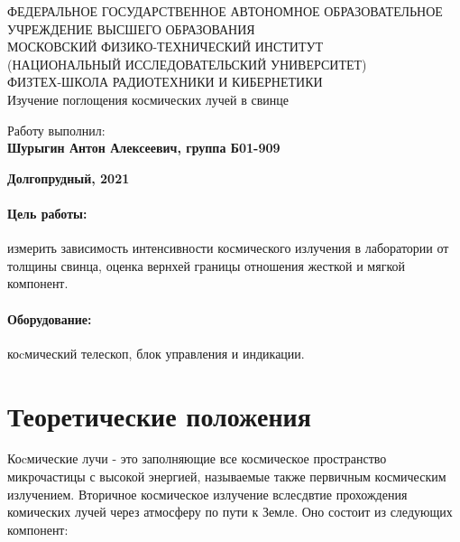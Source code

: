 \documentclass[15pt,a5paper,reqno]{article}
\begin{document}
\begin{center}
  {\small ФЕДЕРАЛЬНОЕ ГОСУДАРСТВЕННОЕ АВТОНОМНОЕ ОБРАЗОВАТЕЛЬНОЕ\\ УЧРЕЖДЕНИЕ ВЫСШЕГО ОБРАЗОВАНИЯ\\ МОСКОВСКИЙ ФИЗИКО-ТЕХНИЧЕСКИЙ ИНСТИТУТ\\ (НАЦИОНАЛЬНЫЙ ИССЛЕДОВАТЕЛЬСКИЙ УНИВЕРСИТЕТ)\\ ФИЗТЕХ-ШКОЛА РАДИОТЕХНИКИ И КИБЕРНЕТИКИ}\\
  \hfill \break
  \hfill \break
  \hfill \break
  \Huge{Изучение поглощения космических лучей в свинце}\\
\end{center}

\hfill \break
\hfill \break
\hfill \break
\hfill \break
\hfill \break
\hfill \break

\begin{flushright}
  \normalsize{Работу выполнил:}\\
  \normalsize{\textbf{Шурыгин Антон Алексеевич, группа Б01-909}}\\
\end{flushright}

\begin{center}
  \normalsize{\textbf{Долгопрудный, 2021}}
\end{center}


\thispagestyle{empty} %


\newpage
\thispagestyle{plain}
\tableofcontents
\thispagestyle{plain}
\newpage


\paragraph{Цель работы:} измерить зависимость интенсивности космического излучения в лаборатории от толщины свинца, оценка вернхей границы отношения жесткой и мягкой компонент.
\paragraph{Оборудование:} коcмический телескоп, блок управления и индикации.

\section{Теоретические положения}

Коcмические лучи - это заполняющие все космическое пространство микрочастицы с высокой энергией, называемые также первичным космическим излучением. 
Вторичное космическое излучение вслесдвтие прохождения комических лучей через атмосферу по пути к Земле. Оно состоит из следующих компонент:
\end{document}
